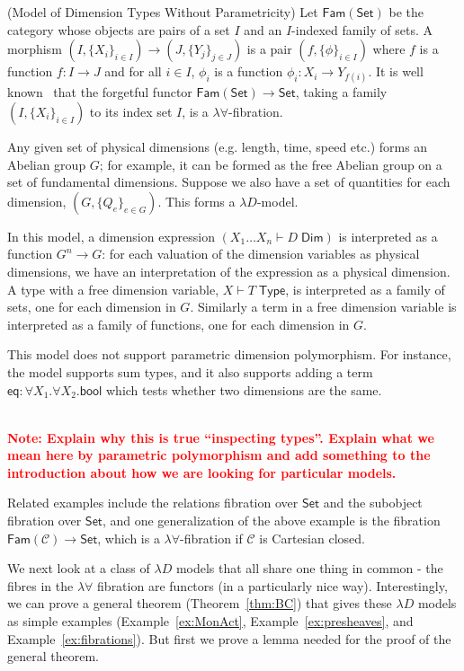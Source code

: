 \documentclass[a4paper,UKenglish]{lipics}
\newcommand\note[1]{{ \bf \textcolor{red} {\vspace{2mm}\; \\ Note: #1\\}}}
\newcommand{\msf}[1]{\mathsf{#1}} %
\newcommand{\Set}{\msf{Set}}
\newcommand{\Fam}[1]{\msf{Fam}(#1)}
\newcommand{\C}{\mathcal{C}}
\newcommand{\bool}{\msf{bool}}
\newcommand{\Tj}[2]{#1 \vdash #2 \; \msf{ Type}}
\newcommand{\Dj}[2]{#1 \vdash #2 \; \msf{ Dim}}
\newcommand{\Dim}{D}
\newcommand{\Dvar}{X}
\begin{document}
\begin{example}(Model of Dimension Types Without Parametricity)
Let $\Fam\Set$ be the category whose objects are pairs of a set $I$ and an $I$-indexed family of sets. A morphism $(I,\{X_i\}_{i\in I})\to (J,\{Y_j\}_{j\in J})$ is a pair $(f,\{\phi\}_{i\in I})$ where $f$ is a function $f:I\to J$ and for all $i\in I$, $\phi_i$ is a function $\phi_i:X_i\to Y_{f(i)}$. It is well known~\cite{} that the forgetful functor $\Fam\Set\to \Set$, taking a family $(I,\{X_i\}_{i\in I})$ to its index set $I$, is a $\lambda\forall$-fibration.

Any given set of physical dimensions (e.g. length, time, speed etc.) forms an Abelian group $G$; for example, it can be formed as the free Abelian group on a set of fundamental dimensions. Suppose we also have a set of quantities for each dimension, $(G,\{Q_e\}_{e\in G})$. This forms a $\lambda D$-model.

In this model, a dimension expression $(\Dj{\Dvar_1\dots \Dvar_n} \Dim)$ is interpreted as a function $G^n\to G$: for each valuation of the dimension variables as physical dimensions, we have an interpretation of the expression as a physical dimension. A type with a free dimension variable, $\Tj \Dvar T$, is interpreted as a family of sets, one for each dimension in $G$. Similarly a term in a free dimension variable is interpreted as a family of functions, one for each dimension in $G$.

This model does not support parametric dimension polymorphism. For instance, the model supports sum types, and it also supports adding a term $\mathsf{eq}:\forall \Dvar_1.\forall \Dvar_2.\bool$ which tests whether two dimensions are the same.

\note{Explain why this is true ``inspecting types''. Explain what we mean here by parametric polymorphism and add something to the introduction about how we are looking for particular models.}
\end{example}

Related examples include the relations fibration over $\Set$ and the subobject fibration over $\Set$, and one generalization of the above example is the fibration $\Fam{\C}\to\Set$, which is a $\lambda\forall$-fibration if $\C$ is Cartesian closed.

We next look at a class of $\lambda D$ models that all share one thing in common - the fibres in the $\lambda \forall$ fibration are functors (in a particularly nice way). Interestingly, we can prove a general theorem (Theorem~\ref{thm:BC}) that gives these $\lambda D$ models as simple examples (Example~\ref{ex:MonAct}, Example~\ref{ex:presheaves}, and Example~\ref{ex:fibrations}). But first we prove a lemma needed for the proof of the general theorem.  
\end{document}
